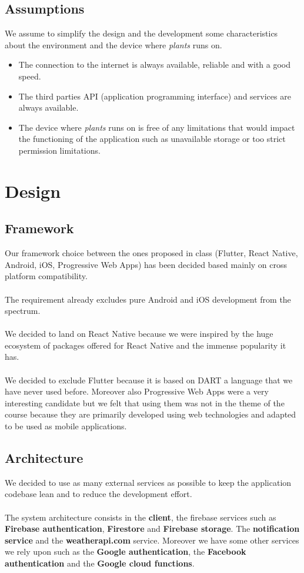 \documentclass[10pt]{article}
\begin{document}
	\subsection{Assumptions}
	We assume to simplify the design and the development some characteristics about the environment and the device where \textit{plants} runs on.
	
	\begin{itemize}
		\item The connection to the internet is always available, reliable and with a good speed.
		\item The third parties API (application programming interface) and services are always available.
		\item The device where \textit{plants} runs on is free of any limitations that would impact the functioning of the application such as unavailable storage or too strict permission limitations.
	\end{itemize}
	
	\newpage
	\section{Design}
	\subsection{Framework}
	Our framework choice between the ones proposed in class (Flutter, React Native, Android, iOS, Progressive Web Apps) has been decided based mainly on cross platform compatibility. \\\\ The requirement already excludes pure Android and iOS development from the spectrum. \\\\We decided to land on React Native because we were inspired by the huge ecosystem of packages offered for React Native and the immense popularity it has. \\\\ We decided to exclude Flutter because it is based on DART a language that we have never used before. Moreover also Progressive Web Apps were a very interesting candidate but we felt that using them was not in the theme of the course because they are primarily developed using web technologies and adapted to be used as mobile applications.
	
	\subsection{Architecture}
	We decided to use as many external services as possible to keep the application codebase lean and to reduce the development effort. \\\\
	The system architecture consists in the \textbf{client}, the firebase services such as \textbf{Firebase authentication}, \textbf{Firestore} and \textbf{Firebase storage}. The \textbf{notification service} and the \textbf{weatherapi.com} service. Moreover we have some other services we rely upon such as the \textbf{Google authentication}, the \textbf{Facebook authentication} and the \textbf{Google cloud functions}.
	
\end{document}
